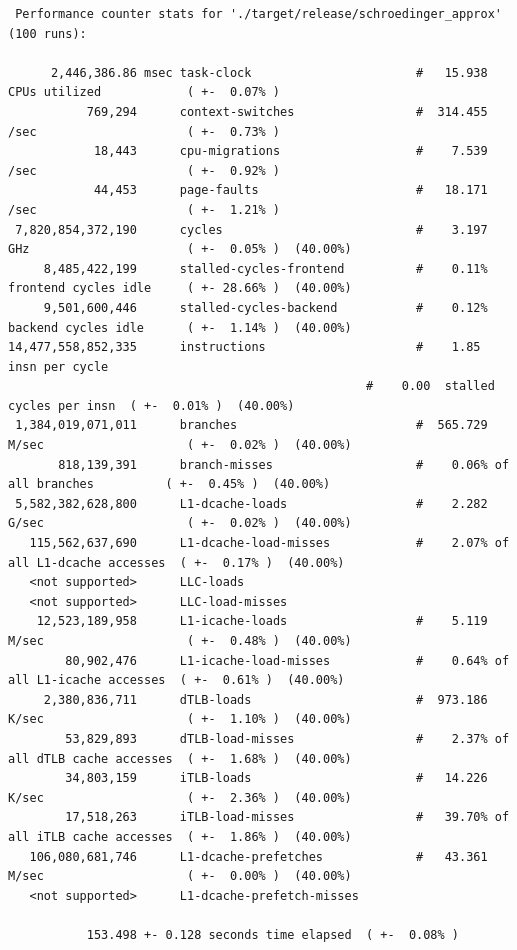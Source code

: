 \documentclass[11pt,DIV=10,final]{scrreprt} %
\begin{document}
\begin{appendix}
{\begin{lstlisting}
 Performance counter stats for './target/release/schroedinger_approx' (100 runs):

      2,446,386.86 msec task-clock                       #   15.938 CPUs utilized            ( +-  0.07% )
           769,294      context-switches                 #  314.455 /sec                     ( +-  0.73% )
            18,443      cpu-migrations                   #    7.539 /sec                     ( +-  0.92% )
            44,453      page-faults                      #   18.171 /sec                     ( +-  1.21% )
 7,820,854,372,190      cycles                           #    3.197 GHz                      ( +-  0.05% )  (40.00%)
     8,485,422,199      stalled-cycles-frontend          #    0.11% frontend cycles idle     ( +- 28.66% )  (40.00%)
     9,501,600,446      stalled-cycles-backend           #    0.12% backend cycles idle      ( +-  1.14% )  (40.00%)
14,477,558,852,335      instructions                     #    1.85  insn per cycle
                                                  #    0.00  stalled cycles per insn  ( +-  0.01% )  (40.00%)
 1,384,019,071,011      branches                         #  565.729 M/sec                    ( +-  0.02% )  (40.00%)
       818,139,391      branch-misses                    #    0.06% of all branches          ( +-  0.45% )  (40.00%)
 5,582,382,628,800      L1-dcache-loads                  #    2.282 G/sec                    ( +-  0.02% )  (40.00%)
   115,562,637,690      L1-dcache-load-misses            #    2.07% of all L1-dcache accesses  ( +-  0.17% )  (40.00%)
   <not supported>      LLC-loads
   <not supported>      LLC-load-misses
    12,523,189,958      L1-icache-loads                  #    5.119 M/sec                    ( +-  0.48% )  (40.00%)
        80,902,476      L1-icache-load-misses            #    0.64% of all L1-icache accesses  ( +-  0.61% )  (40.00%)
     2,380,836,711      dTLB-loads                       #  973.186 K/sec                    ( +-  1.10% )  (40.00%)
        53,829,893      dTLB-load-misses                 #    2.37% of all dTLB cache accesses  ( +-  1.68% )  (40.00%)
        34,803,159      iTLB-loads                       #   14.226 K/sec                    ( +-  2.36% )  (40.00%)
        17,518,263      iTLB-load-misses                 #   39.70% of all iTLB cache accesses  ( +-  1.86% )  (40.00%)
   106,080,681,746      L1-dcache-prefetches             #   43.361 M/sec                    ( +-  0.00% )  (40.00%)
   <not supported>      L1-dcache-prefetch-misses

           153.498 +- 0.128 seconds time elapsed  ( +-  0.08% )
\end{lstlisting}

}
\end{appendix}
\end{document}

